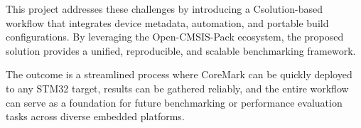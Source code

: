 This project addresses these challenges by introducing a Csolution-based workflow that integrates device metadata, automation, and portable build configurations. By leveraging the Open-CMSIS-Pack ecosystem, the proposed solution provides a unified, reproducible, and scalable benchmarking framework.

The outcome is a streamlined process where CoreMark can be quickly deployed to any STM32 target, results can be gathered reliably, and the entire workflow can serve as a foundation for future benchmarking or performance evaluation tasks across diverse embedded platforms.
